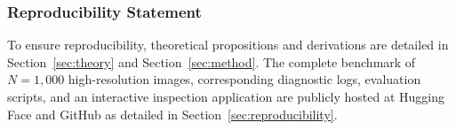 \documentclass[11pt]{article}
\theoremstyle{definition}
\begin{document}
\subsubsection*{Reproducibility Statement}
To ensure reproducibility, theoretical propositions and derivations are detailed in Section~\ref{sec:theory} and Section~\ref{sec:method}. The complete benchmark of $N=1,000$ high-resolution images, corresponding diagnostic logs, evaluation scripts, and an interactive inspection application are publicly hosted at Hugging Face and GitHub as detailed in Section~\ref{sec:reproducibility}.



\end{document}
